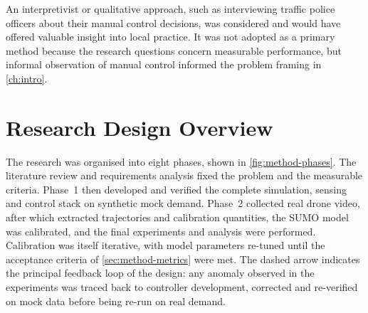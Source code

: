 An interpretivist or qualitative approach, such as interviewing traffic police officers about their manual control decisions, was considered and would have offered valuable insight into local practice. It was not adopted as a primary method because the research questions concern measurable performance, but informal observation of manual control informed the problem framing in \cref{ch:intro}.

\section{Research Design Overview}\label{sec:method-design}

The research was organised into eight phases, shown in \cref{fig:method-phases}. The literature review and requirements analysis fixed the problem and the measurable criteria. Phase~1 then developed and verified the complete simulation, sensing and control stack on synthetic mock demand. Phase~2 collected real drone video, after which \dtx{} extracted trajectories and calibration quantities, the SUMO model was calibrated, and the final experiments and analysis were performed. Calibration was itself iterative, with model parameters re-tuned until the acceptance criteria of \cref{sec:method-metrics} were met. The dashed arrow indicates the principal feedback loop of the design: any anomaly observed in the experiments was traced back to controller development, corrected and re-verified on mock data before being re-run on real demand.

